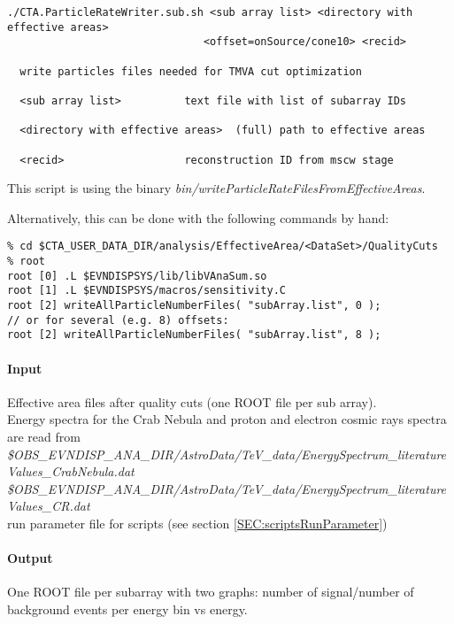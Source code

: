 \documentclass[titlepage,a4paper,twoside,11pt]{report}
\begin{document}
\begin{lstlisting}
./CTA.ParticleRateWriter.sub.sh <sub array list> <directory with effective areas> 
                               <offset=onSource/cone10> <recid> 

  write particles files needed for TMVA cut optimization

  <sub array list>          text file with list of subarray IDs

  <directory with effective areas>  (full) path to effective areas

  <recid>                   reconstruction ID from mscw stage
\end{lstlisting}

This script is using the binary {\it bin/writeParticleRateFilesFromEffectiveAreas}.

Alternatively, this can be done with the following commands by hand:

\begin{lstlisting}
% cd $CTA_USER_DATA_DIR/analysis/EffectiveArea/<DataSet>/QualityCuts
% root 
root [0] .L $EVNDISPSYS/lib/libVAnaSum.so
root [1] .L $EVNDISPSYS/macros/sensitivity.C
root [2] writeAllParticleNumberFiles( "subArray.list", 0 );
// or for several (e.g. 8) offsets:
root [2] writeAllParticleNumberFiles( "subArray.list", 8 );
\end{lstlisting}

\paragraph{Input}
Effective area files after quality cuts (one ROOT file per sub array). \\
Energy spectra for the Crab Nebula and proton and electron cosmic rays spectra are read from \\
{\it \$OBS\_EVNDISP\_ANA\_DIR/AstroData/TeV\_data/EnergySpectrum\_literatureValues\_CrabNebula.dat} \\
{\it \$OBS\_EVNDISP\_ANA\_DIR/AstroData/TeV\_data/EnergySpectrum\_literatureValues\_CR.dat} \\
run parameter file for scripts (see section \ref{SEC:scriptsRunParameter})

\paragraph{Output}

One ROOT file per subarray with two graphs: number of signal/number of background events per energy bin vs energy.
\end{document}
